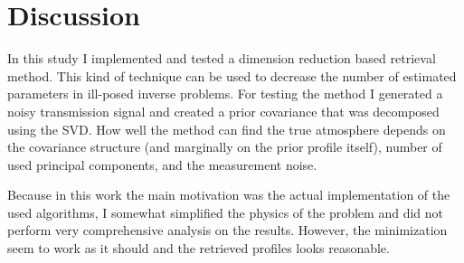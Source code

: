 \documentclass[12pt,a4paper]{article}
\begin{document}
\section{Discussion}

In this study I implemented and tested a dimension reduction based retrieval method. This kind
of technique can be used to decrease the number of estimated parameters in ill-posed inverse problems.
For testing the method I generated a noisy transmission signal and created a prior covariance that
was decomposed using the SVD. How well the method can find the true atmosphere depends on the
covariance structure (and marginally on the prior profile itself), number of used principal 
components, and the measurement noise.

Because in this work the main motivation was the actual implementation of the used algorithms, 
I somewhat simplified the physics of the problem and did not perform very comprehensive 
analysis on the results. However, the minimization seem to work as it should and the retrieved
profiles looks reasonable.

\newpage
\clearpage


\end{document}
